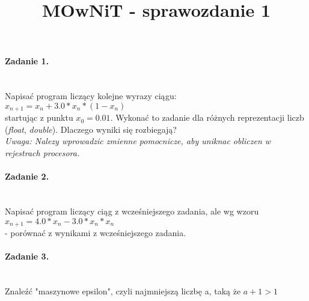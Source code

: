 \documentclass{article}
\title{MOwNiT - sprawozdanie 1}
\begin{document}
  \lstset{language=C}

  \maketitle
  \newpage

  \paragraph{Zadanie 1.} ~\\
  Napisać program liczący kolejne wyrazy ciągu: \\
  $ x_{n+1} = x_{n} + 3.0 * x_{n} * (1 - x_{n}) $ \\
  startując z punktu $ x_{0} = 0.01 $.
  Wykonać to zadanie dla różnych reprezentacji liczb (\textit{float}, \textit{double}).
  Dlaczego wyniki się rozbiegają? \\
  \textit{Uwaga: Nalezy wprowadzic zmienne pomocnicze, aby uniknac obliczen w rejestrach procesora.}
  
  \newpage

  \paragraph{Zadanie 2.} ~\\
  Napisać program liczący ciąg z wcześniejszego zadania, ale wg wzoru\\
  $ x_{n+1} = 4.0 * x_{n} - 3.0 * x_{n} * x_{n} $ \\
  - porównać z wynikami z wcześniejszego zadania.
  
  \newpage

  \paragraph{Zadanie 3.} ~\\
  Znaleźć "maszynowe epsilon", czyli najmniejszą liczbę a, taką że $ a + 1 > 1 $
  
  \newpage
\end{document}
